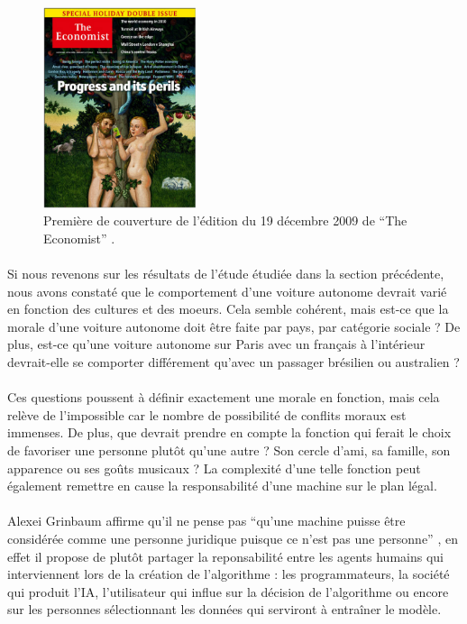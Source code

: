 \documentclass[10pt, french, a4paper]{report}
\begin{document}
\begin{figure}[hbt!]
  \centering
  \includegraphics[width=0.4\textwidth]{images/the_economist_200091219.png}
  \caption{Première de couverture de l'édition du 19 décembre 2009 de ``The Economist'' \cite{theeconomist_progress_2009}.}
  \label{fig:the_economist}
\end{figure}

\paragraph{}
Si nous revenons sur les résultats de l'étude étudiée dans la section précédente, nous avons constaté que le comportement d'une voiture autonome devrait varié en fonction des cultures et des moeurs. Cela semble cohérent, mais est-ce que la morale d'une voiture autonome doit être faite par pays, par catégorie sociale ? De plus, est-ce qu'une voiture autonome sur Paris avec un français à l'intérieur devrait-elle se comporter différement qu'avec un passager brésilien ou australien ?   

\paragraph{}
Ces questions poussent à définir exactement une morale en fonction, mais cela relève de l'impossible car le nombre de possibilité de conflits moraux est immenses. De plus, que devrait prendre en compte la fonction qui ferait le choix de favoriser une personne plutôt qu'une autre ? Son cercle d'ami, sa famille, son apparence ou ses goûts musicaux ? La complexité d'une telle fonction peut également remettre en cause la responsabilité d'une machine sur le plan légal.

\paragraph{}
Alexei Grinbaum affirme qu'il ne pense pas ``qu’une machine puisse être considérée comme une personne juridique puisque ce n’est pas une personne'' \citep{grinbaum__2019}, en effet il propose de plutôt partager la reponsabilité entre les agents humains qui interviennent lors de la création de l'algorithme : les programmateurs, la société qui produit l'IA, l'utilisateur qui influe sur la décision de l'algorithme ou encore sur les personnes sélectionnant les données qui serviront à entraîner le modèle.
\end{document}
